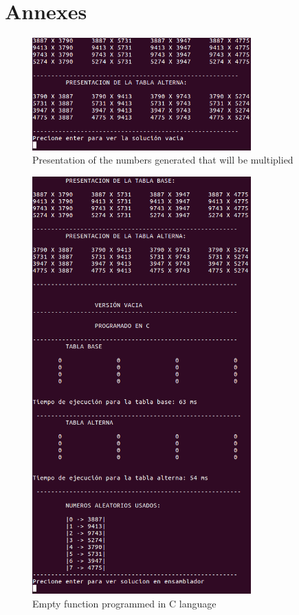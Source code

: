 \documentclass[legalpaper,12pt]{article}
\begin{document}
\section{Annexes}

\begin{figure}[htbp]
  \centering
    \includegraphics[width=0.75\textwidth]{Inicio.png}
  \caption{Presentation of the numbers generated that will be multiplied}
  \label{fig:Inicio}
\end{figure}


\begin{figure}[htbp]
  \centering
    \includegraphics[width=0.75\textwidth]{Vacia_C.png}
  \caption{Empty function programmed in C language}
  \label{fig:vacia_c}
\end{figure}
\end{document}
